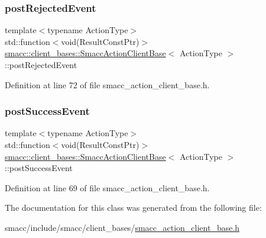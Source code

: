 \subsubsection{\texorpdfstring{post\+Rejected\+Event}{postRejectedEvent}}
{\footnotesize\ttfamily template$<$typename Action\+Type$>$ \\
std\+::function$<$void(Result\+Const\+Ptr)$>$ \hyperlink{classsmacc_1_1client__bases_1_1SmaccActionClientBase}{smacc\+::client\+\_\+bases\+::\+Smacc\+Action\+Client\+Base}$<$ Action\+Type $>$\+::post\+Rejected\+Event}



Definition at line 72 of file smacc\+\_\+action\+\_\+client\+\_\+base.\+h.

\mbox{\label{classsmacc_1_1client__bases_1_1SmaccActionClientBase_afb4f82508cd653d496392f321e84a783}} 
\subsubsection{\texorpdfstring{post\+Success\+Event}{postSuccessEvent}}
{\footnotesize\ttfamily template$<$typename Action\+Type$>$ \\
std\+::function$<$void(Result\+Const\+Ptr)$>$ \hyperlink{classsmacc_1_1client__bases_1_1SmaccActionClientBase}{smacc\+::client\+\_\+bases\+::\+Smacc\+Action\+Client\+Base}$<$ Action\+Type $>$\+::post\+Success\+Event}



Definition at line 69 of file smacc\+\_\+action\+\_\+client\+\_\+base.\+h.



The documentation for this class was generated from the following file\+:\begin{DoxyCompactItemize}
\item 
smacc/include/smacc/client\+\_\+bases/\hyperlink{smacc__action__client__base_8h}{smacc\+\_\+action\+\_\+client\+\_\+base.\+h}\end{DoxyCompactItemize}
